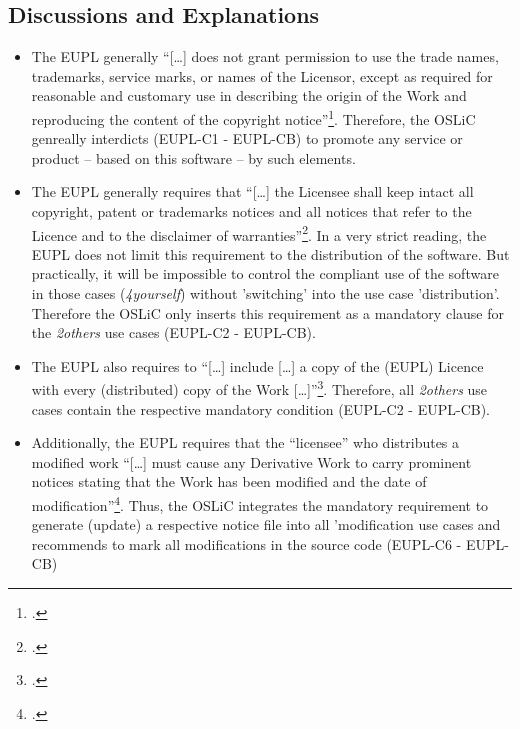\subsection{Discussions and Explanations}
\begin{itemize}
  
  \item The EUPL generally \enquote{[\ldots] does not grant permission to use
  the trade names, trademarks, service marks, or names of the Licensor, except
  as required for reasonable and customary use in describing the origin of the
  Work and reproducing the content of the copyright
  notice}\footcite[cf.][\nopage wp.\ §5]{EuplLicense2007en}. Therefore, the OSLiC
  genreally interdicts (EUPL-C1 - EUPL-CB) to promote any service or product --
  based on this software -- by such elements.

  \item The EUPL generally requires that \enquote{[\ldots] the Licensee shall
  keep intact all copyright, patent or trademarks notices and all notices that
  refer to the Licence and to the disclaimer of
  warranties}\footcite[cf.][\nopage wp.\ §5]{EuplLicense2007en}. In a very strict
  reading, the EUPL does not limit this requirement to the distribution of the
  software. But practically, it will be impossible to control the compliant use
  of the software in those cases (\emph{4yourself}) without 'switching' into the
  use case 'distribution'. Therefore the OSLiC only inserts this requirement as
  a mandatory clause for the \emph{2others} use cases (EUPL-C2 - EUPL-CB).
  
  \item The EUPL also requires to \enquote{[\ldots] include [\ldots] a copy of
  the (EUPL) Licence with every (distributed) copy of the Work
  [\ldots]}\footcite[cf.][\nopage wp.\ §5]{EuplLicense2007en}. Therefore, all
  \emph{2others} use cases contain the respective mandatory condition (EUPL-C2 -
  EUPL-CB).
  
  \item Additionally, the EUPL requires that the \enquote{licensee} who
  distributes a modified work \enquote{[\ldots] must cause any Derivative Work
  to carry prominent notices stating that the Work has been modified and the
  date of modification}\footcite[cf.][\nopage wp.\ §5]{EuplLicense2007en}. Thus,
  the OSLiC integrates the mandatory requirement to generate (update) a
  respective notice file into all 'modification use cases and recommends to mark
  all modifications in the source code (EUPL-C6 - EUPL-CB)
  

\end{itemize}
